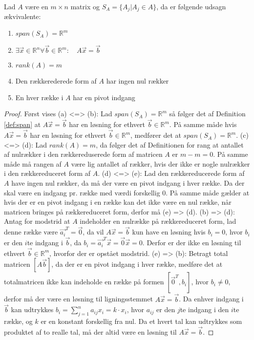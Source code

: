 \begin{stn}
Lad $A$ være en $m\times n$ matrix og $S_A= \{A_j| A_j \in A\}$, da er følgende udsagn ækvivalente:
\begin{enumerate}[label=\alph*]
\item $span(S_A) = \mathds{R}^m$
\item $\exists \vec{x} \in \mathds{R}^n \forall \vec{b} \in \mathds{R}^m: \quad A\vec{x}=\vec{b}$
\item $rank(A) = m$
\item Den rækkerederede form af $A$ har ingen nul rækker
\item En hver række i $A$ har en pivot indgang
\end{enumerate}
\end{stn}
\begin{proof}
Først vises (a) <=> (b):
Lad $span(S_A) = \mathds{R}^m$ så følger det af Definition \ref{def:span} at $A\vec{x}= \vec{b}$ har en løsning for ethvert $\vec{b} \in \mathds{R}^m$.
På samme måde hvis $A\vec{x}= \vec{b}$ har en løsning for ethvert $\vec{b} \in \mathds{R}^m$, medfører det at $span(S_A) = \mathds{R}^m$. 
(c) <=> (d): 
Lad $rank(A) = m$, da følger det af Definitionen for rang at antallet af nulrækker i den rækkereduserede form af matricen $A$ er $m-m = 0$.
På samme måde må rangen af $A$ være lig antallet af rækker, hvis der ikke er nogle nulrækker i den rækkereduceret form af $A$.
(d) <=> (e):
Lad den rækkereducerede form af $A$ have ingen nul rækker, da må der være en pivot indgang i hver række. 
Da der skal være en indgang pr. række med værdi forskellig $0$. 
På samme måde gælder at hvis der er en pivot indgang i en række kan det ikke være en nul række, når matricen bringes på rækkereduceret form, derfor må (e) => (d).
(b) => (d):
Antag for modstrid at $A$ indeholder en nulrække på rækkereduceret form, lad denne række være $\vec{a_i}^T = \vec{0}$, da vil $A\vec{x} = \vec{b}$ kun have en løsning hvis $b_i=0$, hvor $b_i$ er den $i$te indgang i $\vec{b}$, da $b_i = \vec{a_i}^T \vec{x} = \vec{0} \vec{x} = 0$. 
Derfor er der ikke en løsning til ethvert $\vec{b} \in \mathds{R}^m$, hvorfor der er opstået modstrid.
(e) => (b): 
Betragt total matricen $[A \vec{b}]$, da der er en pivot indgang i hver række, medføre det at totalmatricen ikke kan indeholde en række på formen $[\vec{0}^T, b_i]$, hvor $b_i \neq 0$, derfor må der være en løsning til ligningsstemmet $A\vec{x} = \vec{b}$.
Da enhver indgang i $\vec{b}$ kan udtrykkes $b_i = \sum_{j=1}^n a_{ij} x_i = k \cdot x_i$, hvor $a_{ij}$ er den $j$te indgang i den $i$te række, og $k$ er en konstant forskellig fra nul.
Da et hvert tal kan udtrykkes som produktet af to realle tal, må der altid være en løsning til $A\vec{x}=\vec{b}$.
\end{proof}


